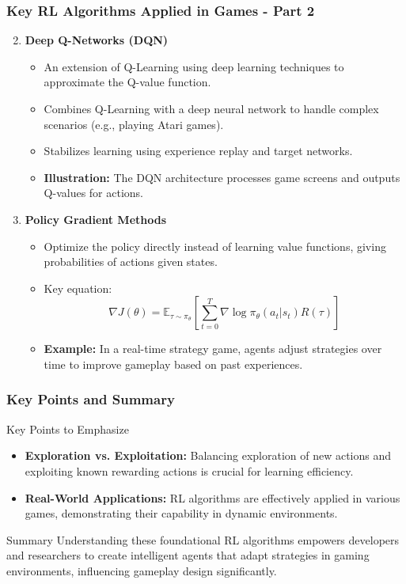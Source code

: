 \documentclass[aspectratio=169]{beamer}
\begin{document}
\begin{frame}[fragile]
    \frametitle{Key RL Algorithms Applied in Games - Part 2}
    \begin{enumerate}
        \setcounter{enumi}{1}
        \item \textbf{Deep Q-Networks (DQN)}
        \begin{itemize}
            \item An extension of Q-Learning using deep learning techniques to approximate the Q-value function.
            \item Combines Q-Learning with a deep neural network to handle complex scenarios (e.g., playing Atari games).
            \item Stabilizes learning using experience replay and target networks.
            \item \textbf{Illustration:} The DQN architecture processes game screens and outputs Q-values for actions.
        \end{itemize}
        
        \item \textbf{Policy Gradient Methods}
        \begin{itemize}
            \item Optimize the policy directly instead of learning value functions, giving probabilities of actions given states.
            \item Key equation:
            \begin{equation}
                \nabla J(\theta) = \mathbb{E}_{\tau \sim \pi_\theta} \left[ \sum_{t=0}^{T} \nabla \log \pi_\theta(a_t | s_t) R(\tau) \right]
            \end{equation}
            \item \textbf{Example:} In a real-time strategy game, agents adjust strategies over time to improve gameplay based on past experiences.
        \end{itemize}
    \end{enumerate}
\end{frame}

\begin{frame}[fragile]
    \frametitle{Key Points and Summary}
    \begin{block}{Key Points to Emphasize}
        \begin{itemize}
            \item \textbf{Exploration vs. Exploitation:} Balancing exploration of new actions and exploiting known rewarding actions is crucial for learning efficiency.
            \item \textbf{Real-World Applications:} RL algorithms are effectively applied in various games, demonstrating their capability in dynamic environments.
        \end{itemize}
    \end{block}

    \begin{block}{Summary}
        Understanding these foundational RL algorithms empowers developers and researchers to create intelligent agents that adapt strategies in gaming environments, influencing gameplay design significantly.
    \end{block}
\end{frame}
\end{document}
